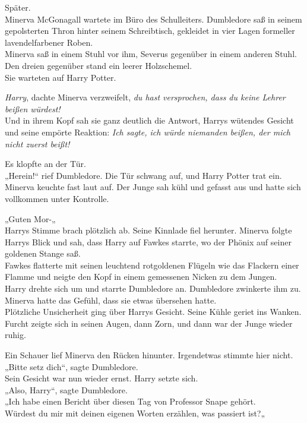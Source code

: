 {Später.\\ Minerva McGonagall wartete im Büro des Schulleiters. Dumbledore saß in seinem gepolsterten Thron hinter seinem Schreibtisch, gekleidet in vier Lagen formeller lavendelfarbener Roben.\\ Minerva saß in einem Stuhl vor ihm, Severus gegenüber in einem anderen Stuhl. Den dreien gegenüber stand ein leerer Holzschemel.\\ Sie warteten auf Harry Potter.

\emph{Harry}, dachte Minerva verzweifelt, \emph{du hast versprochen, dass du keine Lehrer beißen würdest!}\\ Und in ihrem Kopf sah sie ganz deutlich die Antwort, Harrys wütendes Gesicht und seine empörte Reaktion: \emph{Ich sagte, ich würde niemanden beißen, der mich nicht zuerst beißt!}

Es klopfte an der Tür.\\ „Herein!“ rief Dumbledore. Die Tür schwang auf, und Harry Potter trat ein.\\ Minerva keuchte fast laut auf. Der Junge sah kühl und gefasst aus und hatte sich vollkommen unter Kontrolle.

„Guten Mor-„\\ Harrys Stimme brach plötzlich ab. Seine Kinnlade fiel herunter. Minerva folgte Harrys Blick und sah, dass Harry auf Fawkes starrte, wo der Phönix auf seiner goldenen Stange saß.\\ Fawkes flatterte mit seinen leuchtend rotgoldenen Flügeln wie das Flackern einer Flamme und neigte den Kopf in einem gemessenen Nicken zu dem Jungen.\\ Harry drehte sich um und starrte Dumbledore an. Dumbledore zwinkerte ihm zu. Minerva hatte das Gefühl, dass sie etwas übersehen hatte.\\ Plötzliche Unsicherheit ging über Harrys Gesicht. Seine Kühle geriet ins Wanken. Furcht zeigte sich in seinen Augen, dann Zorn, und dann war der Junge wieder ruhig.

Ein Schauer lief Minerva den Rücken hinunter. Irgendetwas stimmte hier nicht.\\ „Bitte setz dich“, sagte Dumbledore.\\ Sein Gesicht war nun wieder ernst. Harry setzte sich.\\ „Also, Harry“, sagte Dumbledore.\\ „Ich habe einen Bericht über diesen Tag von Professor Snape gehört.\\ Würdest du mir mit deinen eigenen Worten erzählen, was passiert ist?„

}
